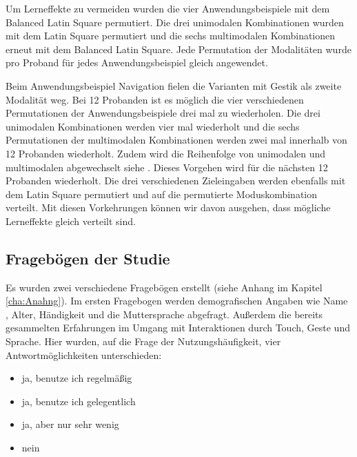 Um Lerneffekte zu vermeiden wurden die vier Anwendungsbeispiele mit dem Balanced Latin Square permutiert. 
Die drei unimodalen Kombinationen wurden mit dem Latin Square permutiert und die sechs multimodalen Kombinationen erneut mit dem Balanced Latin Square. 
Jede Permutation der Modalitäten wurde pro Proband für jedes Anwendungsbeispiel gleich angewendet. 

Beim Anwendungsbeispiel Navigation fielen die Varianten mit Gestik als zweite Modalität weg. 
Bei 12 Probanden ist es möglich die vier verschiedenen Permutationen der Anwendungsbeispiele drei mal zu wiederholen. 
Die drei unimodalen Kombinationen werden vier mal wiederholt und die sechs Permutationen der multimodalen Kombinationen werden zwei mal innerhalb von 12 Probanden wiederholt. 
Zudem wird die Reihenfolge von unimodalen und multimodalen abgewechselt siehe . Dieses Vorgehen wird für die nächsten 12 Probanden wiederholt. 
Die drei verschiedenen Zieleingaben werden ebenfalls mit dem Latin Square permutiert und auf die permutierte Moduskombination verteilt. 
Mit diesen Vorkehrungen können wir davon ausgehen, dass mögliche Lerneffekte gleich verteilt sind.   
\subsection[Fragebögen]{Fragebögen der Studie}
Es wurden zwei verschiedene Fragebögen erstellt (siehe Anhang im Kapitel \ref{cha:Anahng}). 
Im ersten Fragebogen werden demografischen Angaben wie Name , Alter, Händigkeit und die Muttersprache abgefragt. 
Außerdem die bereits gesammelten Erfahrungen im Umgang mit Interaktionen durch Touch, Geste und Sprache. 
Hier wurden, auf die Frage der Nutzungshäufigkeit, vier Antwortmöglichkeiten unterschieden:
\begin{itemize}
	\item ja, benutze ich regelmäßig 
	\item ja, benutze ich gelegentlich
	\item ja, aber nur sehr wenig
	\item nein
\end{itemize}

